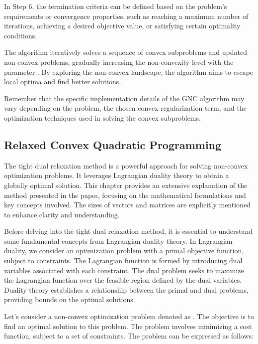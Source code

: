 In Step 6, the termination criteria can be defined based on the problem's requirements or convergence properties, such as reaching a maximum number of iterations, achieving a desired objective value, or satisfying certain optimality conditions.

The algorithm iteratively solves a sequence of convex subproblems and updated non-convex problems, gradually increasing the non-convexity level with the parameter . By exploring the non-convex landscape, the algorithm aims to escape local optima and find better solutions.

Remember that the specific implementation details of the GNC algorithm may vary depending on the problem, the chosen convex regularization term, and the optimization techniques used in solving the convex subproblems.

\subsection{Relaxed Convex Quadratic Programming} \label{subs:2-pose-estimation-relaxed-convex-quadratic-programming}


The tight dual relaxation method is a powerful approach for solving non-convex optimization problems. It leverages Lagrangian duality theory to obtain a globally optimal solution. This chapter provides an extensive explanation of the method presented in the paper, focusing on the mathematical formulations and key concepts involved. The sizes of vectors and matrices are explicitly mentioned to enhance clarity and understanding.

Before delving into the tight dual relaxation method, it is essential to understand some fundamental concepts from Lagrangian duality theory. In Lagrangian duality, we consider an optimization problem with a primal objective function, subject to constraints. The Lagrangian function is formed by introducing dual variables associated with each constraint. The dual problem seeks to maximize the Lagrangian function over the feasible region defined by the dual variables. Duality theory establishes a relationship between the primal and dual problems, providing bounds on the optimal solutions.

Let's consider a non-convex optimization problem denoted as . The objective is to find an optimal solution to this problem. The problem involves minimizing a cost function, subject to a set of constraints. The problem can be expressed as follows:

